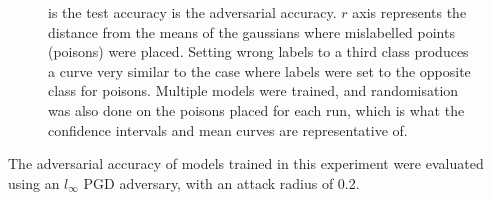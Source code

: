 \documentclass{ociamthesis}
\begin{document}
\begin{figure}[!h]
    \centering
    \qquad
    \caption{ is the
    test accuracy  is the
    adversarial accuracy. $r$ axis represents the distance from the means of the
    gaussians where mislabelled points (poisons) were placed. Setting wrong
    labels to a third class produces a curve very similar to the case where
    labels were set to the opposite class for poisons. Multiple models were
    trained, and randomisation was also done on the poisons placed for each run,
    which is what the confidence intervals and mean curves are representative
    of.}
    \label{fig:far-gaussian-curve}
\end{figure}

The adversarial accuracy of models trained in this experiment were evaluated
using an $l_\infty$ PGD adversary, with an attack radius of 0.2.
\end{document}

